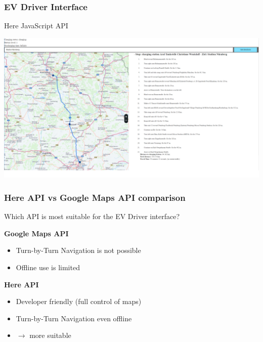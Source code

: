 \begin{frame}
	\frametitle{EV Driver Interface}

	Here JavaScript API

	\vspace*{-3mm}
	\begin{minipage}[t][0cm]{\paperwidth}%
		\hspace*{-\PraesentationSeitenrand}%
		\includegraphics[width=\paperwidth]{images/user_interface.png}
	\end{minipage}

\end{frame}
\clearpage




\begin{frame}
	\frametitle{Here API vs Google Maps API comparison}

	Which API is most suitable for the EV Driver interface?

	\vspace{-8mm}
	\begin{PraesentationAufzaehlung}

		\item \textbf{Google Maps API}
		\begin{itemize}
			\item Turn-by-Turn Navigation is not possible
			\item Offline use is limited
		\end{itemize}

		\item \textbf{Here API}
		\begin{itemize}
			\item Developer friendly (full control of maps)
			\item Turn-by-Turn Navigation even offline
			\item $\rightarrow$ more suitable
		\end{itemize}

	\end{PraesentationAufzaehlung}
\end{frame}
\clearpage




